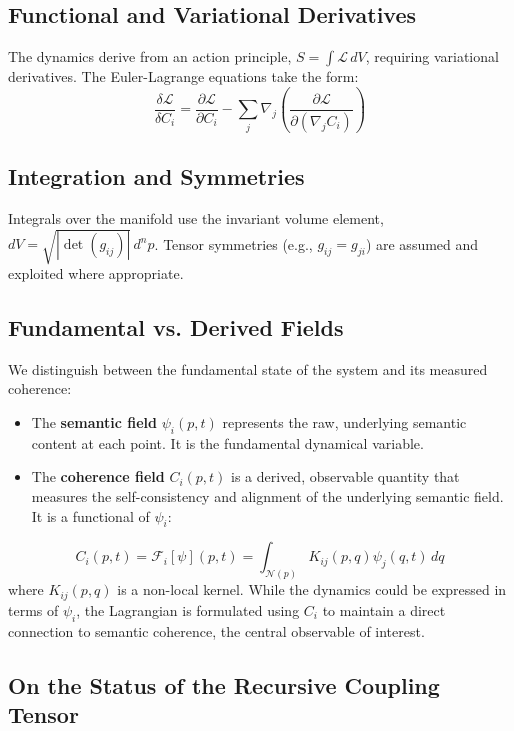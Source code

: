 \subsection{Functional and Variational Derivatives}

The dynamics derive from an action principle, \(S = \int \mathcal{L} \, dV\), requiring variational derivatives. The Euler-Lagrange equations take the form:
\begin{equation}
\frac{\delta \mathcal{L}}{\delta C_i} = \frac{\partial \mathcal{L}}{\partial C_i} - \sum_j \nabla_j \left( \frac{\partial \mathcal{L}}{\partial (\nabla_j C_i)} \right)
\end{equation}

\subsection{Integration and Symmetries}

Integrals over the manifold use the invariant volume element, \(dV = \sqrt{|\det(g_{ij})|} \, d^n p\). Tensor symmetries (e.g., \(g_{ij} = g_{ji}\)) are assumed and exploited where appropriate.

\subsection{Fundamental vs. Derived Fields}

We distinguish between the fundamental state of the system and its measured coherence:
\begin{itemize}
    \item The \textbf{semantic field} \(\psi_i(p,t)\) represents the raw, underlying semantic content at each point. It is the fundamental dynamical variable.
    \item The \textbf{coherence field} \(C_i(p,t)\) is a derived, observable quantity that measures the self-consistency and alignment of the underlying semantic field. It is a functional of \(\psi_i\):
\end{itemize}
\begin{equation}
C_i(p,t) = \mathcal{F}_i[\psi](p,t) = \int_{\mathcal{N}(p)} K_{ij}(p,q) \psi_j(q,t) \, dq
\end{equation}
where \(K_{ij}(p,q)\) is a non-local kernel. While the dynamics could be expressed in terms of \(\psi_i\), the Lagrangian is formulated using \(C_i\) to maintain a direct connection to semantic coherence, the central observable of interest.

\subsection{On the Status of the Recursive Coupling Tensor}

